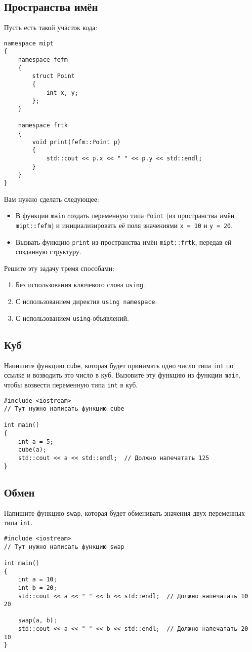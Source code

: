 \documentclass{article}
\begin{document}
\subsection{Пространства имён}
Пусть есть такой участок кода:
\begin{lstlisting}
namespace mipt
{
	namespace fefm
	{
		struct Point
		{
			int x, y;
		};
	}
	
	namespace frtk
	{
		void print(fefm::Point p)
		{
			std::cout << p.x << " " << p.y << std::endl;
		}
	}
}
\end{lstlisting}
Вам нужно сделать следующее:
\begin{itemize}
\item В функции \texttt{main} cоздать переменную типа \texttt{Point} (из пространства имён \texttt{mipt::fefm}) и инициализировать её поля значениями \texttt{x = 10} и \texttt{y = 20}.
\item Вызвать функцию \texttt{print} из пространства имён \texttt{mipt::frtk}, передав ей созданную структуру.
\end{itemize}
Решите эту задачу тремя способами:
\begin{enumerate}
\item Без использования ключевого слова \texttt{using}.
\item С использованием директив \texttt{using namespace}.
\item С использованием \texttt{using}-объявлений.
\end{enumerate}

\subsection{Куб}
Напишите функцию \texttt{cube}, которая будет принимать одно число типа \texttt{int} по ссылке и возводить это число в куб. Вызовите эту функцию из функции \texttt{main}, чтобы возвести переменную типа \texttt{int} в куб.
\begin{lstlisting}
#include <iostream>
// Тут нужно написать функцию cube

int main()
{
	int a = 5;
	cube(a);
	std::cout << a << std::endl;  // Должно напечатать 125
}
\end{lstlisting}


\subsection{Обмен}
Напишите функцию \texttt{swap}, которая будет обменивать значения двух переменных типа \texttt{int}.
\begin{lstlisting}
#include <iostream>
// Тут нужно написать функцию swap

int main()
{
	int a = 10;
	int b = 20;
	std::cout << a << " " << b << std::endl;  // Должно напечатать 10 20
	
	swap(a, b);
	std::cout << a << " " << b << std::endl;  // Должно напечатать 20 10
}
\end{lstlisting}
\end{document}
